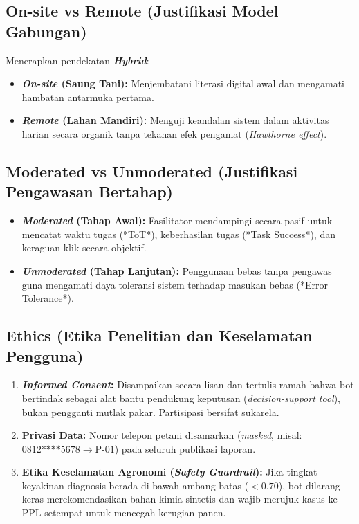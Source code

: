 \documentclass[11pt,a4paper]{article}
\begin{document}
\subsection{On-site vs Remote (Justifikasi Model Gabungan)}
Menerapkan pendekatan \textbf{\textit{Hybrid}}:
\begin{itemize}[noitemsep]
    \item \textbf{\textit{On-site} (Saung Tani):} Menjembatani literasi digital awal dan mengamati hambatan antarmuka pertama.
    \item \textbf{\textit{Remote} (Lahan Mandiri):} Menguji keandalan sistem dalam aktivitas harian secara organik tanpa tekanan efek pengamat (\textit{Hawthorne effect}).
\end{itemize}

\subsection{Moderated vs Unmoderated (Justifikasi Pengawasan Bertahap)}
\begin{itemize}[noitemsep]
    \item \textbf{\textit{Moderated} (Tahap Awal):} Fasilitator mendampingi secara pasif untuk mencatat waktu tugas (*ToT*), keberhasilan tugas (*Task Success*), dan keraguan klik secara objektif.
    \item \textbf{\textit{Unmoderated} (Tahap Lanjutan):} Penggunaan bebas tanpa pengawas guna mengamati daya toleransi sistem terhadap masukan bebas (*Error Tolerance*).
\end{itemize}

\subsection{Ethics (Etika Penelitian dan Keselamatan Pengguna)}
\begin{enumerate}[noitemsep]
    \item \textbf{\textit{Informed Consent}:} Disampaikan secara lisan dan tertulis ramah bahwa bot bertindak sebagai alat bantu pendukung keputusan (\textit{decision-support tool}), bukan pengganti mutlak pakar. Partisipasi bersifat sukarela.
    \item \textbf{Privasi Data:} Nomor telepon petani disamarkan (\textit{masked}, misal: $0812\text{****}5678 \to \text{P-01}$) pada seluruh publikasi laporan.
    \item \textbf{Etika Keselamatan Agronomi (\textit{Safety Guardrail}):} Jika tingkat keyakinan diagnosis berada di bawah ambang batas ($< 0.70$), bot dilarang keras merekomendasikan bahan kimia sintetis dan wajib merujuk kasus ke PPL setempat untuk mencegah kerugian panen.
\end{enumerate}
\end{document}
